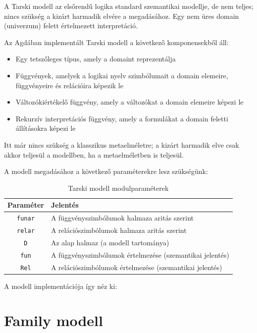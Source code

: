 

A Tarski modell az elsőrendű logika standard szemantikai modellje, de nem teljes; nincs szükség a kizárt harmadik elvére a megadásához. Egy nem üres domain (univerzum) felett értelmezett interpretáció.

Az Agdában implementált Tarski modell a következő komponensekből áll:

\begin{itemize}
\item Egy tetszőleges típus, amely a domaint reprezentálja
\item Függvények, amelyek a logikai nyelv szimbólumait a domain elemeire, függvényeire és relációira képezik le
\item Változókiértékelő függvény, amely a változókat a domain elemeire képezi le
\item Rekurzív interpretációs függvény, amely a formulákat a domain feletti állításokra képezi le
\end{itemize}

Itt már nincs szükség a klasszikus metaelméletre; a kizárt harmadik elve csak akkor teljesül a modellben, ha a metaelméletben is teljesül.

A modell megadásához a következő paraméterekre lesz szükségünk:
\tmModuleParams

\begin{table}[H]
\centering
\begin{tabular}{|c|l|}
\hline
\textbf{Paraméter} & \textbf{Jelentés} \\
\hline
\texttt{funar} & A függvényszimbólumok halmaza aritás szerint \\
\hline
\texttt{relar} & A relációszimbólumok halmaza aritás szerint \\
\hline
\texttt{D} & Az alap halmaz (a modell tartománya) \\
\hline
\texttt{fun} & A függvényszimbólumok értelmezése (szemantikai jelentés) \\
\hline
\texttt{Rel} & A relációszimbólumok értelmezése (szemantikai jelentés) \\
\hline
\end{tabular}
\caption{Tarski modell modulparaméterek}
\label{tab:tarski_module_params}
\end{table}
    

A modell implementációja így néz ki:

\tmTarski

\section{Family modell}

